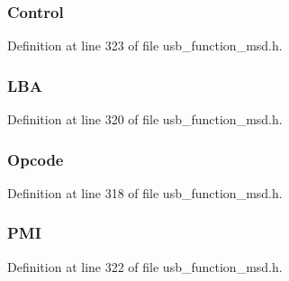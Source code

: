 \subsubsection[{Control}]{ Control}\label{struct_read_capacity_c_b_a5dc24656c27deb12af74c98930f0bfc5}


Definition at line 323 of file usb\+\_\+function\+\_\+msd.\+h.

\hypertarget{struct_read_capacity_c_b_a025861a8c903e77ef60526f18da19bb1}{}
\subsubsection[{L\+B\+A}]{ L\+B\+A}\label{struct_read_capacity_c_b_a025861a8c903e77ef60526f18da19bb1}


Definition at line 320 of file usb\+\_\+function\+\_\+msd.\+h.

\hypertarget{struct_read_capacity_c_b_a3ac7536b907732d60214ae553910eed9}{}
\subsubsection[{Opcode}]{ Opcode}\label{struct_read_capacity_c_b_a3ac7536b907732d60214ae553910eed9}


Definition at line 318 of file usb\+\_\+function\+\_\+msd.\+h.

\hypertarget{struct_read_capacity_c_b_ae3e24593a6a3b388840b8984a96583c8}{}
\subsubsection[{P\+M\+I}]{ P\+M\+I}\label{struct_read_capacity_c_b_ae3e24593a6a3b388840b8984a96583c8}


Definition at line 322 of file usb\+\_\+function\+\_\+msd.\+h.

\hypertarget{struct_read_capacity_c_b_a0e359e73bbb61ef44681fba3fd463b5d}{}
